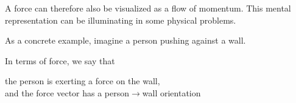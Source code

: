 \documentclass[a4paper,12pt,%
onecolumn,oneside,titlepage,%
british%
]{memoir}
\renewcommand*{\|}[1][]{\nonscript\:#1\vert\nonscript\:\mathopen{}}
\begin{document}
A force can therefore also be visualized as a flow of momentum. This mental representation can be illuminating in some physical problems.

As a concrete example, imagine a person pushing against a wall. {In terms of force, we say that\noprelistbreak%
\begin{center}\color{green}
  the person is exerting a force on the wall,\\
  and the force vector has a \textcolor{bluepurple}{person$\rightarrow$wall orientation}
\end{center}
}
\end{document}
